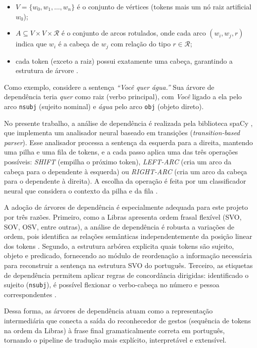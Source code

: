 \documentclass[
    12pt,                %
    openright,           %
    oneside,             %
    a4paper,             %
    english,             %
    brazil               %
]{abntex2}
\begin{document}
\begin{itemize}
    \item $V = \{w_0, w_1, \ldots, w_n\}$ é o conjunto de vértices (tokens mais um nó raiz artificial $w_0$);
    \item $A \subseteq V \times V \times \mathcal{R}$ é o conjunto de arcos rotulados, onde cada arco $(w_i, w_j, r)$ indica que $w_i$ é a cabeça de $w_j$ com relação do tipo $r \in \mathcal{R}$;
    \item cada token (exceto a raiz) possui exatamente uma cabeça, garantindo a estrutura de árvore \cite{Jurafsky2023}.
\end{itemize}
 
Como exemplo, considere a sentença \textit{``Você quer água.''} Sua árvore de dependência teria \textit{quer} como raiz (verbo principal), com \textit{Você} ligado a ela pelo arco \texttt{nsubj} (sujeito nominal) e \textit{água} pelo arco \texttt{obj} (objeto direto).
  
No presente trabalho, a análise de dependência é realizada pela biblioteca spaCy \cite{Honnibal2020}, que implementa um analisador neural baseado em transições (\textit{transition-based parser}). Esse analisador processa a sentença da esquerda para a direita, mantendo uma pilha e uma fila de tokens, e a cada passo aplica uma das três operações possíveis: \textit{SHIFT} (empilha o próximo token), \textit{LEFT-ARC} (cria um arco da cabeça para o dependente à esquerda) ou \textit{RIGHT-ARC} (cria um arco da cabeça para o dependente à direita). A escolha da operação é feita por um classificador neural que considera o contexto da pilha e da fila \cite{Honnibal2020}.
  
A adoção de árvores de dependência é especialmente adequada para este projeto por três razões. Primeiro, como a Libras apresenta ordem frasal flexível (SVO, SOV, OSV, entre outras), a análise de dependência é robusta a variações de ordem, pois identifica as relações semânticas independentemente da posição linear dos tokens \cite{Jurafsky2023}. Segundo, a estrutura arbórea explicita quais tokens são sujeito, objeto e predicado, fornecendo ao módulo de reordenação a informação necessária para reconstruir a sentença na estrutura SVO do português. Terceiro, as etiquetas de dependência permitem aplicar regras de concordância dirigidas: identificado o sujeito (\texttt{nsubj}), é possível flexionar o verbo-cabeça no número e pessoa correspondentes \cite{Bird2009}.
 
Dessa forma, as árvores de dependência atuam como a representação intermediária que conecta a saída do reconhecedor de gestos (sequência de tokens na ordem da Libras) à frase final gramaticalmente correta em português, tornando o pipeline de tradução mais explícito, interpretável e extensível.
\end{document}
